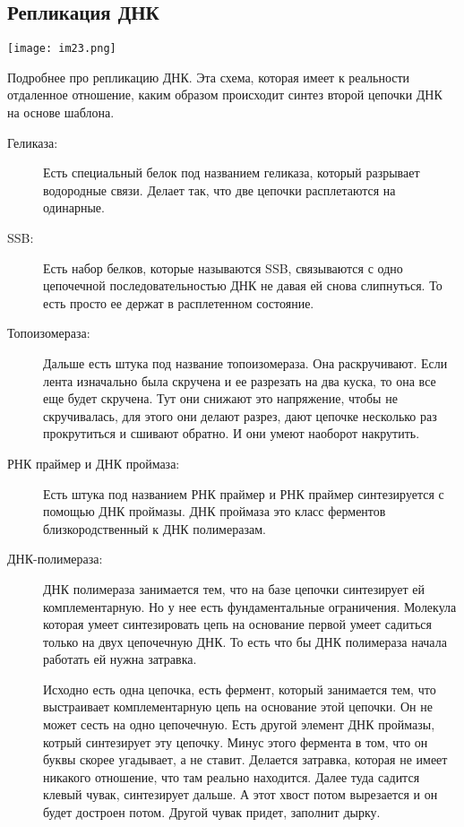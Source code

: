 \subsection{Репликация ДНК}
\texttt{[image: im23.png]}

Подробнее про репликацию ДНК. Эта схема, которая имеет к реальности 
отдаленное отношение, каким образом происходит синтез второй цепочки ДНК на 
основе шаблона.

\begin{description} 
\item[Геликаза:]
Есть специальный белок под названием геликаза, который разрывает водородные связи. 
Делает так, что две цепочки расплетаются на одинарные. 
\item[SSB:]
Есть набор белков, которые называются SSB, связываются с одно цепочечной последовательностью ДНК
не давая ей снова слипнуться. То есть просто ее держат в расплетенном состояние. 
\item[Топоизомераза:]
Дальше есть штука под название топоизомераза.  Она раскручивают. Если лента изначально была 
скручена и ее разрезать на два куска, то она все еще будет скручена. Тут они снижают это 
напряжение, чтобы не скручивалась, для этого они делают разрез, дают 
цепочке несколько раз прокрутиться и сшивают обратно. И они 
умеют наоборот накрутить. 

\item[РНК праймер и ДНК проймаза:]
Есть штука под названием РНК праймер и РНК праймер синтезируется с помощью
ДНК проймазы. ДНК проймаза это класс ферментов близкородственный к ДНК 
полимеразам. 
\item[ДНК-полимераза:]
ДНК полимераза занимается тем, что на базе 
цепочки синтезирует ей комплементарную. Но у нее есть фундаментальные ограничения. 
Молекула которая умеет синтезировать цепь на основание первой умеет садиться 
только на двух цепочечную ДНК. То есть что бы ДНК полимераза начала работать 
ей нужна затравка. 

Исходно есть одна цепочка, есть фермент, который занимается тем, что выстраивает 
комплементарную цепь на основание этой цепочки. Он не может 
сесть на одно цепочечную. Есть другой элемент ДНК проймазы, котрый 
синтезирует эту цепочку. Минус этого 
фермента в том, что он буквы скорее угадывает, а не ставит. Делается 
затравка, которая не имеет никакого отношение, что там реально находится. 
Далее туда садится клевый чувак, синтезирует дальше. А этот хвост потом вырезается и он 
будет достроен потом. Другой чувак придет, заполнит дырку. 


\end{description}
